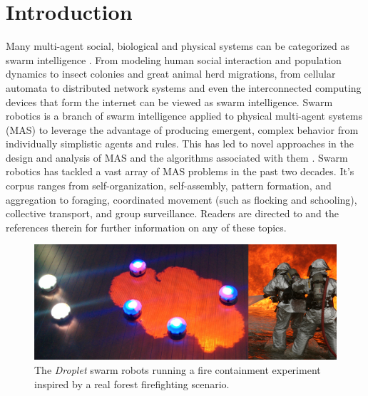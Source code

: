 \documentclass[defaultstyle,12pt]{thesis}
\begin{document}
\chapter{Introduction}
Many multi-agent social, biological and physical systems can be categorized as swarm intelligence \cite{Beni2005}. From modeling human social interaction and population dynamics to insect colonies and great animal herd migrations, from cellular automata to distributed network systems and even the interconnected computing devices that form the internet can be viewed as swarm intelligence. Swarm robotics \cite{Sahin2005} is a branch of swarm intelligence applied to physical multi-agent systems (MAS) to leverage the advantage of producing emergent, complex behavior from individually simplistic agents and rules. This has led to novel approaches in the design and analysis of MAS and the algorithms associated with them \cite{Brambilla2013}. Swarm robotics has tackled a vast array of MAS problems in the past two decades. It's corpus ranges from self-organization, self-assembly, pattern formation, and aggregation to foraging, coordinated movement (such as flocking and schooling), collective transport, and group surveillance. Readers are directed to \cite{Bayindir2007} and the references therein for further information on any of these topics. 

\begin{figure}[!tb]
	\centering\includegraphics[width=\textwidth]{../assets/dropletfire.png}
	\centering\caption{The \emph{Droplet} swarm robots running a fire containment experiment inspired by a real forest firefighting scenario.}\label{fig:dropletfire}
\end{figure}
\end{document}
